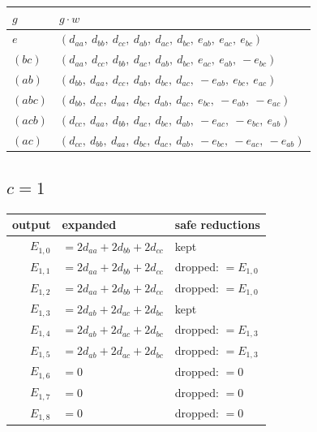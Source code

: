 \documentclass[10pt]{article}
\begin{document}
\begin{longtable}{ll}
$g$ & $g \cdot w$ \\ \hline
$e$ & $(d_{aa},\ d_{bb},\ d_{cc},\ d_{ab},\ d_{ac},\ d_{bc},\ e_{ab},\ e_{ac},\ e_{bc})$ \\
$(b c)$ & $(d_{aa},\ d_{cc},\ d_{bb},\ d_{ac},\ d_{ab},\ d_{bc},\ e_{ac},\ e_{ab},\ -e_{bc})$ \\
$(a b)$ & $(d_{bb},\ d_{aa},\ d_{cc},\ d_{ab},\ d_{bc},\ d_{ac},\ -e_{ab},\ e_{bc},\ e_{ac})$ \\
$(a b c)$ & $(d_{bb},\ d_{cc},\ d_{aa},\ d_{bc},\ d_{ab},\ d_{ac},\ e_{bc},\ -e_{ab},\ -e_{ac})$ \\
$(a c b)$ & $(d_{cc},\ d_{aa},\ d_{bb},\ d_{ac},\ d_{bc},\ d_{ab},\ -e_{ac},\ -e_{bc},\ e_{ab})$ \\
$(a c)$ & $(d_{cc},\ d_{bb},\ d_{aa},\ d_{bc},\ d_{ac},\ d_{ab},\ -e_{bc},\ -e_{ac},\ -e_{ab})$ \\
\end{longtable}

\subsection*{$c = 1$}
\begin{longtable}{r>{\raggedright\arraybackslash}p{}>{\raggedright\arraybackslash}p{}}
output & expanded & safe reductions \\ \hline
$E_{1,0}$ & $= 2 d_{aa} + 2 d_{bb} + 2 d_{cc}$ & kept \\
$E_{1,1}$ & $= 2 d_{aa} + 2 d_{bb} + 2 d_{cc}$ & dropped: $= E_{1,0}$ \\
$E_{1,2}$ & $= 2 d_{aa} + 2 d_{bb} + 2 d_{cc}$ & dropped: $= E_{1,0}$ \\
$E_{1,3}$ & $= 2 d_{ab} + 2 d_{ac} + 2 d_{bc}$ & kept \\
$E_{1,4}$ & $= 2 d_{ab} + 2 d_{ac} + 2 d_{bc}$ & dropped: $= E_{1,3}$ \\
$E_{1,5}$ & $= 2 d_{ab} + 2 d_{ac} + 2 d_{bc}$ & dropped: $= E_{1,3}$ \\
$E_{1,6}$ & $= 0$ & dropped: $= 0$ \\
$E_{1,7}$ & $= 0$ & dropped: $= 0$ \\
$E_{1,8}$ & $= 0$ & dropped: $= 0$ \\
\end{longtable}
\end{document}
